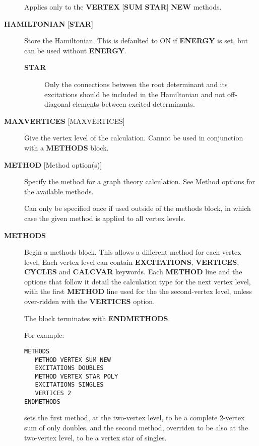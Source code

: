 \documentclass[openany,a4paper,10pt]{manual}
\begin{document}
\begin{description}
Applies only to the \textbf{VERTEX} {[}\textbf{SUM} \textbf{STAR}{]} \textbf{NEW} methods.

\item[\textbf{HAMILTONIAN} {[}\textbf{STAR}{]}]
Store the Hamiltonian.  This is defaulted to ON if \textbf{ENERGY} is set,
but can be used without \textbf{ENERGY}.
\begin{description}
\item[\textbf{STAR}]
Only the connections between the root determinant and its
excitations should be included in the Hamiltonian and not
off-diagonal elements between excited determinants.

\end{description}

\item[\textbf{MAXVERTICES} {[}MAXVERTICES{]}]
Give the vertex level of the calculation.  Cannot be used in
conjunction with a \textbf{METHODS} block.

\item[\textbf{METHOD} {[}Method option(s){]}]
Specify the method for a graph theory calculation.  See Method
options for the available methods.

Can only be specified once if used outside of the methods block,
in which case the given method is applied to all vertex levels.

\item[\textbf{METHODS}]
Begin a methods block.  This allows a different method for each vertex
level.  Each vertex level can contain \textbf{EXCITATIONS}, \textbf{VERTICES},
\textbf{CYCLES} and \textbf{CALCVAR} keywords.
Each \textbf{METHOD} line and the options that follow it detail the calculation
type for the next vertex level, with the first \textbf{METHOD} line used for the
the second-vertex level, unless over-ridden with the \textbf{VERTICES} option.

The block terminates with \textbf{ENDMETHODS}.

For example:

\begin{Verbatim}[commandchars=@\[\]]
METHODS
   METHOD VERTEX SUM NEW
   EXCITATIONS DOUBLES
   METHOD VERTEX STAR POLY
   EXCITATIONS SINGLES
   VERTICES 2
ENDMETHODS
\end{Verbatim}

sets the first method, at the two-vertex level, to be a complete 2-vertex
sum of only doubles, and the second method, overriden to be also at
the two-vertex level, to be a vertex star of singles.


\end{description}
\end{document}
